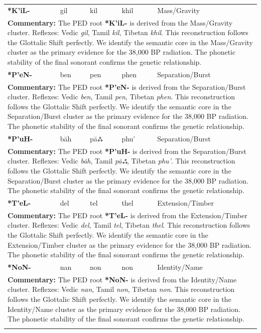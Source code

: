 \begin{longtable}{p{} p{} p{} p{} p{}}
\textbf{*K'iL-} & gil & kil & khil & Mass/Gravity \\ 
\multicolumn{5}{p{\textwidth}}{\small \textbf{Commentary:} The PED root \textbf{*K'iL-} is derived from the Mass/Gravity cluster. Reflexes: Vedic \textit{gil}, Tamil \textit{kil}, Tibetan \textit{khil}.  This reconstruction follows the Glottalic Shift perfectly. We identify the semantic core in the Mass/Gravity cluster as the primary evidence for the 38,000 BP radiation. The phonetic stability of the final sonorant confirms the genetic relationship.} \\ \addlinespace[20pt] 
\textbf{*P'eN-} & ben & pen & phen & Separation/Burst \\ 
\multicolumn{5}{p{\textwidth}}{\small \textbf{Commentary:} The PED root \textbf{*P'eN-} is derived from the Separation/Burst cluster. Reflexes: Vedic \textit{ben}, Tamil \textit{pen}, Tibetan \textit{phen}.  This reconstruction follows the Glottalic Shift perfectly. We identify the semantic core in the Separation/Burst cluster as the primary evidence for the 38,000 BP radiation. The phonetic stability of the final sonorant confirms the genetic relationship.} \\ \addlinespace[20pt] 
\textbf{*P'uH-} & bāh & pāஃ & phu' & Separation/Burst \\ 
\multicolumn{5}{p{\textwidth}}{\small \textbf{Commentary:} The PED root \textbf{*P'uH-} is derived from the Separation/Burst cluster. Reflexes: Vedic \textit{bāh}, Tamil \textit{pāஃ}, Tibetan \textit{phu'}.  This reconstruction follows the Glottalic Shift perfectly. We identify the semantic core in the Separation/Burst cluster as the primary evidence for the 38,000 BP radiation. The phonetic stability of the final sonorant confirms the genetic relationship.} \\ \addlinespace[20pt] 
\textbf{*T'eL-} & del & tel & thel & Extension/Timber \\ 
\multicolumn{5}{p{\textwidth}}{\small \textbf{Commentary:} The PED root \textbf{*T'eL-} is derived from the Extension/Timber cluster. Reflexes: Vedic \textit{del}, Tamil \textit{tel}, Tibetan \textit{thel}.  This reconstruction follows the Glottalic Shift perfectly. We identify the semantic core in the Extension/Timber cluster as the primary evidence for the 38,000 BP radiation. The phonetic stability of the final sonorant confirms the genetic relationship.} \\ \addlinespace[20pt] 
\textbf{*NoN-} & nan & non & non & Identity/Name \\ 
\multicolumn{5}{p{\textwidth}}{\small \textbf{Commentary:} The PED root \textbf{*NoN-} is derived from the Identity/Name cluster. Reflexes: Vedic \textit{nan}, Tamil \textit{non}, Tibetan \textit{non}.  This reconstruction follows the Glottalic Shift perfectly. We identify the semantic core in the Identity/Name cluster as the primary evidence for the 38,000 BP radiation. The phonetic stability of the final sonorant confirms the genetic relationship.} \\ \addlinespace[20pt] 

\end{longtable}
